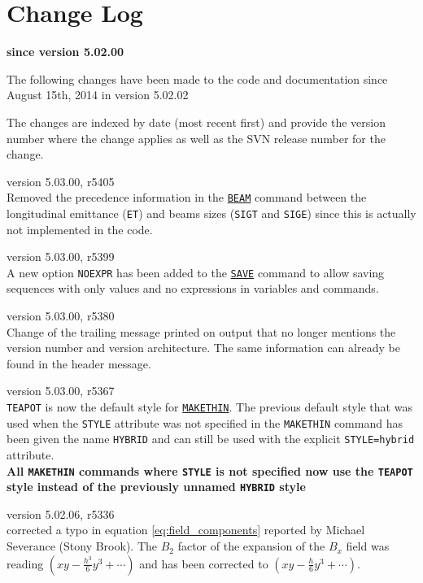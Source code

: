 \chapter*{Change Log}
\label{chap:changelog}

\begin{center} 
\textbf{since version 5.02.00}
\end{center}

The following changes have been made to the code and documentation since
August 15th, 2014 in version 5.02.02

The changes are indexed by date (most recent first) and provide the \madx 
version number where the change applies as well as the SVN 
release number for the change. 

\begin{madlist}
   version 5.03.00, r5405\\
  Removed the precedence information in the \hyperref[sec:beam]{\tt BEAM} 
  command between the longitudinal emittance ({\tt ET}) and beams sizes 
  ({\tt SIGT} and {\tt SIGE}) since this is actually not implemented in the 
  code.
  
   version 5.03.00, r5399\\
  A new option {\tt NOEXPR} has been added to the \hyperref[sec:save]{\tt SAVE} 
  command to allow saving sequences with only values and no expressions in 
  variables and commands.
  
   version 5.03.00, r5380\\
  Change of the trailing message printed on output that no longer 
  mentions the version number and version architecture. 
  The same information can already be found in the header message.

   version 5.03.00, r5367\\
  {\tt TEAPOT} is now the default style for 
  \hyperref[chap:makethin]{\tt MAKETHIN}. 
  The previous default style that was used when the {\tt STYLE} 
  attribute was not specified in the {\tt MAKETHIN} command 
  has been given the name {\tt HYBRID} 
  and can still be used with the explicit {\tt STYLE=hybrid} attribute. \\
  {\bf All {\tt MAKETHIN} commands where {\tt STYLE} is not specified now
  use the {\tt TEAPOT} style instead of the previously unnamed {\tt HYBRID} 
  style}

   version 5.02.06, r5336 \\
  corrected a typo in equation \ref{eq:field_components} 
  reported by Michael Severance (Stony Brook). 
  The $B_2$ factor of the expansion of the $B_x$ 
  field was reading $(xy - \frac{h^3}{6}y^3+\cdots)$ 
  and has been corrected to $(xy - \frac{h}{6}y^3+\cdots)$.


\end{madlist}
